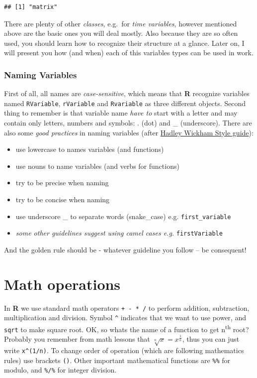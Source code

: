 \documentclass[]{book}
\providecommand{\tightlist}{%
  \setlength{\itemsep}{0pt}\setlength{\parskip}{0pt}}
\theoremstyle{definition}
\theoremstyle{definition}
\theoremstyle{definition}
\theoremstyle{remark}
\begin{document}
\begin{verbatim}
## [1] "matrix"
\end{verbatim}

There are plenty of other \emph{classes}, e.g.~for \emph{time
variables}, however mentioned above are the basic ones you will deal
mostly. Also because they are so often used, you should learn how to
recognize their structure at a glance. Later on, I will present you how
(and when) each of this variables types can be used in work.

\subsubsection{Naming Variables}\label{naming-variables}

First of all, all names are \emph{case-sensitive}, which means that
\textbf{R} recognize variables named \texttt{RVariable},
\texttt{rVariable} and \texttt{Rvariable} as three different objects.
Second thing to remember is that variable name \emph{have to} start with
a letter and may contain only letters, numbers and symbols: . (dot) and
\_ (underscore). There are also some \emph{good practices} in naming
variables (after \href{http://adv-r.had.com.nz/Style.html}{Hadley
Wickham Style guide}):

\begin{itemize}
\tightlist
\item
  use lowercase to names variables (and functions)
\item
  use nouns to name variables (and verbs for functions)
\item
  try to be precise when naming
\item
  try to be concise when naming
\item
  use underscore \_ to separate words (snake\_case) e.g.
  \texttt{first\_variable}
\item
  \emph{some other guidelines suggest using camel cases e.g.}
  \texttt{firstVariable}
\end{itemize}

And the golden rule should be - whatever guideline you follow -- be
consequent!

\section{Math operations}\label{math-operations}

In \textbf{R} we use standard math operators \texttt{+\ -\ *\ /} to
perform addition, subtraction, multiplication and division. Symbol
\texttt{\^{}} indicates that we want to use power, and \texttt{sqrt} to
make square root. OK, so whats the name of a function to get
n\textsuperscript{th} root? Probably you remember from math lessons that
\(\sqrt [n] {x} = x^\frac{1}{n}\), thus you can just write
\texttt{x\^{}(1/n)}. To change order of operation (which are following
mathematics rules) use brackets \texttt{()}. Other important
mathematical functions are \texttt{\%\%} for modulo, and \texttt{\%/\%}
for integer division.
\end{document}
